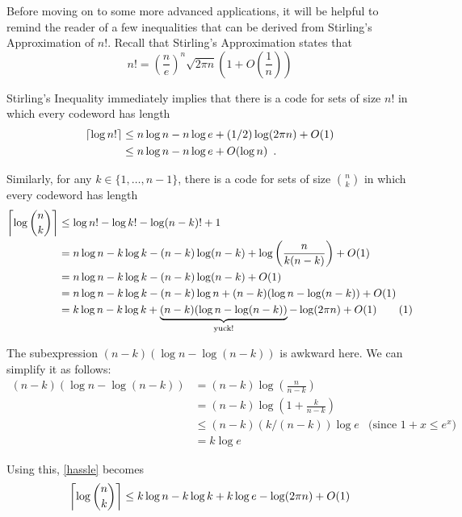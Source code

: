 \documentclass[lotsofwhite]{patmorin}
\newcommand\numberthis{\addtocounter{equation}{1}\tag{\theequation}}
\begin{document}
Before moving on to some more advanced applications, it will be helpful
to remind the reader of a few inequalities that can be derived from
Stirling's Approximation of $n!$.  Recall that Stirling's Approximation
states that
\begin{equation}
  n! = \left(\frac{n}{e}\right)^n\sqrt{2\pi n}\left(1+O\left(\frac{1}{n}\right)\right) 
   \label{stirling}
\end{equation}

Stirling's Inequality immediately implies that there is a code for sets
of size $n!$ in which every codeword has length
\begin{align}
  \lceil \log n!\rceil 
      & \le n\log n - n\log e + (1/2)\log(2\pi n) + O(1)  
             \eqlabel{stirling-tight} \\
      & \le n\log n - n\log e + O(\log n)  
             \eqlabel{stirling-loose} \enspace .
\end{align}

Similarly, for any $k\in\{1,\ldots,n-1\}$, there is a code for sets of 
size $\binom{n}{k}$ in which every codeword has length
\begin{align*}
  \left\lceil\log \binom{n}{k}\right\rceil 
     & \le \log n! - \log k! - \log (n-k)! + 1 \\
     & = n\log n - k\log k - (n-k)\log(n-k) + \log\left(\frac{n}{k(n-k)}\right) + O(1) \\
     & = n\log n - k\log k - (n-k)\log(n-k) + O(1) \\
     & = n\log n - k\log k - (n-k)\log n + (n-k)(\log n-\log(n-k)) + O(1) \\
     & = k\log n - k\log k + \underbrace{(n-k)(\log n-\log(n-k))}_\text{yuck!}  - \log(2\pi n) + O(1) 
         \numberthis \eqlabel{hassle} \\ 
\end{align*}

The subexpression $(n-k)(\log n-\log(n-k))$ is awkward here. We can
simplify it as follows:
\begin{align*}
   (n-k)(\log n-\log(n-k))
      & = (n-k)\log \left(\frac{n}{n-k}\right) \\
      & = (n-k)\log \left(1+\frac{k}{n-k}\right) \\
      & \le (n-k)(k/(n-k))\log e & \text{(since $1+x \le e^x$)} \\
      & = k\log e 
\end{align*}

Using this, \eqref{hassle} becomes
\begin{equation}
  \left\lceil\log \binom{n}{k}\right\rceil 
    \le k\log n - k\log k + k\log e - \log (2\pi n) + O(1) \eqlabel{log-n-choose-k}
\end{equation} 
\end{document}

